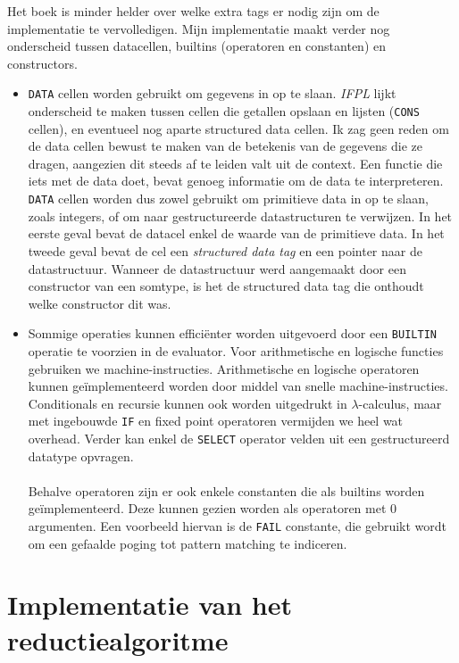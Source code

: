 \documentclass[a4paper,10pt]{article}
\begin{document}
Het boek is minder helder over welke extra tags er nodig zijn om de implementatie te vervolledigen.
Mijn implementatie maakt verder nog onderscheid tussen datacellen, builtins (operatoren en constanten) en constructors.
\begin{itemize}
\item
  \texttt{DATA} cellen worden gebruikt om gegevens in op te slaan.
  \emph{IFPL} lijkt onderscheid te maken tussen cellen die getallen opslaan en lijsten (\texttt{CONS} cellen), en eventueel nog aparte structured data cellen.
  Ik zag geen reden om de data cellen bewust te maken van de betekenis van de gegevens die ze dragen, aangezien dit steeds af te leiden valt uit de context.
  Een functie die iets met de data doet, bevat genoeg informatie om de data te interpreteren.
  \texttt{DATA} cellen worden dus zowel gebruikt om primitieve data in op te slaan, zoals integers, of om naar gestructureerde datastructuren te verwijzen.
  In het eerste geval bevat de datacel enkel de waarde van de primitieve data.
  In het tweede geval bevat de cel een \emph{structured data tag} en een pointer naar de datastructuur.
  Wanneer de datastructuur werd aangemaakt door een constructor van een somtype, is het de structured data tag die onthoudt welke constructor dit was.
\item
  Sommige operaties kunnen effici{\"e}nter worden uitgevoerd door een \texttt{BUILTIN} operatie te voorzien in de evaluator.
  Voor arithmetische en logische functies gebruiken we machine-instructies.
  Arithmetische en logische operatoren kunnen ge{\"i}mplementeerd worden door middel van snelle machine-instructies.
  Conditionals en recursie kunnen ook worden uitgedrukt in $\lambda$-calculus, maar met ingebouwde \texttt{IF} en fixed point operatoren vermijden we heel wat overhead.
  Verder kan enkel de \texttt{SELECT} operator velden uit een gestructureerd datatype opvragen.
  \paragraph{}
  Behalve operatoren zijn er ook enkele constanten die als builtins worden ge{\"i}mplementeerd.
  Deze kunnen gezien worden als operatoren met 0 argumenten.
  Een voorbeeld hiervan is de \texttt{FAIL} constante, die gebruikt wordt om een gefaalde poging tot pattern matching te indiceren.
\end{itemize}

\section{Implementatie van het reductiealgoritme}
\end{document}
